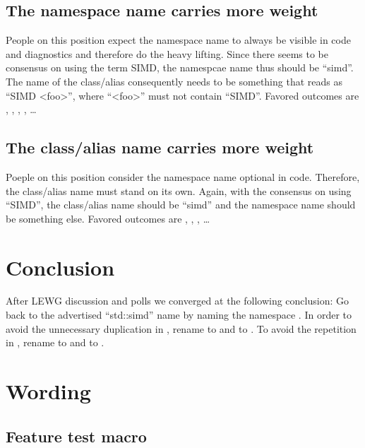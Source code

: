 \subsection{The namespace name carries more weight}
People on this position expect the namespace name to always be visible in code and diagnostics and
therefore do the heavy lifting.
Since there seems to be consensus on using the term SIMD, the namespcae name thus should be “simd”.
The name of the class/alias consequently needs to be something that reads as “SIMD <foo>”, where
“<foo>” must not contain “SIMD”.
Favored outcomes are \stdsimd{}, \stdsimd{}, \stdsimd{},
\stdsimd{}, \ldots

\subsection{The class/alias name carries more weight}
Poeple on this position consider the namespace name optional in code.
Therefore, the class/alias name must stand on its own.
Again, with the consensus on using “SIMD”, the class/alias name should be “simd” and the namespace
name should be something else.
Favored outcomes are \stddatapar{}, \std{},
\std{}, \ldots

\section{Conclusion}
\label{sec:conclusion}

After LEWG discussion and polls we converged at the following conclusion:
Go back to the advertised “std::simd” name by naming the namespace .
In order to avoid the unnecessary duplication in \stdsimd{}, rename
\stdsimd{} to \stdsimd{} and \stdsimd{} to
\stdsimd{}.
To avoid the repetition in \stdsimd{}, rename \stdsimd{} to
\stdsimd{} and \stdsimd{} to \stdsimd{}.

\section{Wording}

\subsection{Feature test macro}

